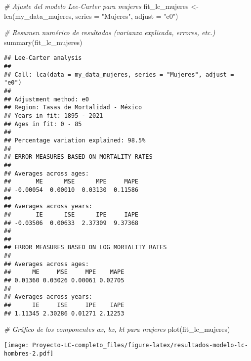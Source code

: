 \documentclass[
]{article}
\newenvironment{Shaded}{\begin{snugshade}}{\end{snugshade}}
\newcommand{\AttributeTok}[1]{\textcolor[rgb]{0.77,0.63,0.00}{#1}}
\newcommand{\CommentTok}[1]{\textcolor[rgb]{0.56,0.35,0.01}{\textit{#1}}}
\newcommand{\FunctionTok}[1]{\textcolor[rgb]{0.00,0.00,0.00}{#1}}
\newcommand{\NormalTok}[1]{#1}
\newcommand{\OtherTok}[1]{\textcolor[rgb]{0.56,0.35,0.01}{#1}}
\newcommand{\SpecialCharTok}[1]{\textcolor[rgb]{0.00,0.00,0.00}{#1}}
\newcommand{\StringTok}[1]{\textcolor[rgb]{0.31,0.60,0.02}{#1}}
\begin{document}
\begin{Shaded}
\begin{Highlighting}[]
\CommentTok{\# Ajuste del modelo Lee{-}Carter para mujeres}
\NormalTok{fit\_lc\_mujeres }\OtherTok{\textless{}{-}} \FunctionTok{lca}\NormalTok{(my\_data\_mujeres, }\AttributeTok{series =} \StringTok{"Mujeres"}\NormalTok{, }\AttributeTok{adjust =} \StringTok{"e0"}\NormalTok{)}

\CommentTok{\# Resumen numérico de resultados (varianza explicada, errores, etc.)}
\FunctionTok{summary}\NormalTok{(fit\_lc\_mujeres)}
\end{Highlighting}
\end{Shaded}

\begin{verbatim}
## Lee-Carter analysis
## 
## Call: lca(data = my_data_mujeres, series = "Mujeres", adjust = "e0") 
## 
## Adjustment method: e0
## Region: Tasas de Mortalidad - México
## Years in fit: 1895 - 2021
## Ages in fit: 0 - 85 
## 
## Percentage variation explained: 98.5%
## 
## ERROR MEASURES BASED ON MORTALITY RATES
## 
## Averages across ages:
##       ME      MSE      MPE     MAPE 
## -0.00054  0.00010  0.03130  0.11586 
## 
## Averages across years:
##       IE      ISE      IPE     IAPE 
## -0.03506  0.00633  2.37309  9.37368 
## 
## 
## ERROR MEASURES BASED ON LOG MORTALITY RATES
## 
## Averages across ages:
##      ME     MSE     MPE    MAPE 
## 0.01360 0.03026 0.00061 0.02705 
## 
## Averages across years:
##      IE     ISE     IPE    IAPE 
## 1.11345 2.30286 0.01271 2.12253
\end{verbatim}

\begin{Shaded}
\begin{Highlighting}[]
\CommentTok{\# Gráfico de los componentes ax, bx, kt para mujeres}
\FunctionTok{plot}\NormalTok{(fit\_lc\_mujeres)}
\end{Highlighting}
\end{Shaded}

\texttt{[image: Proyecto-LC-completo\_files/figure-latex/resultados-modelo-lc-hombres-2.pdf]}

\begin{Shaded}
\end{Shaded}
\end{document}
